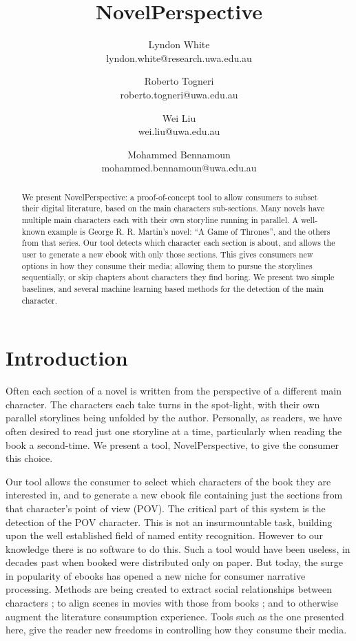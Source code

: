 \documentclass[11pt,a4paper]{article}
\title{NovelPerspective}
\author{Lyndon White \\ lyndon.white@research.uwa.edu.au %
	\and Roberto Togneri \\ roberto.togneri@uwa.edu.au%
	\and Wei Liu \\ wei.liu@uwa.edu.au %
	\and Mohammed Bennamoun \\ mohammed.bennamoun@uwa.edu.au %
}
\newcommand{\parencite}{\citep}
\begin{document}
\maketitle

\begin{abstract}
We present NovelPerspective: a proof-of-concept tool to allow consumers to subset their digital literature, based on the main characters sub-sections.
Many novels have multiple main characters each with their own storyline running in parallel.
A well-known example is George R. R. Martin's  novel: ``A Game of Thrones'', and the others from that series.
Our tool detects which character each section is about,
and allows the user to generate a new ebook with only those sections.
This gives consumers new options in how they consume their media; allowing them to  pursue the storylines sequentially, or skip chapters about characters they find boring.
We present two simple baselines, and several machine learning based methods for the detection of the main character.
\end{abstract}

\section{Introduction}
Often each section of a novel is written  from the perspective of a different main character.
The characters each take turns in the spot-light,
with their own parallel storylines being unfolded by the author.
Personally, as readers, we have often desired to read just one storyline at a time, particularly when reading the book a second-time.
We present a tool, NovelPerspective, to give the consumer this choice.

Our tool allows the consumer to select which characters of the book they are interested in,
and to generate a new ebook file containing just the sections from that character's point of view (POV).
The critical part of this system is the detection of the POV character.
This is not an insurmountable task, building upon the well established field of named entity recognition.
However to our knowledge there is no software to do this.
Such a tool would have been useless, in decades past when booked were distributed only on paper.
But today, the surge in popularity of ebooks has opened a new niche for consumer narrative processing.
Methods are being created to extract social relationships between characters \parencite{elson2010socialnetworks,wohlgenannt2016extracting};
to align scenes in movies with those from books \parencite{moviebook}; and to otherwise augment the literature consumption experience.
Tools such as the one presented here, give the reader new freedoms in controlling how they consume their media.
\end{document}
